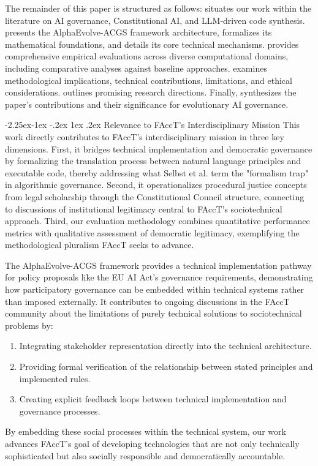 \documentclass[manuscript,screen,review,anonymous,9pt]{acmart}
\makeatletter
\renewcommand\subsection{\@startsection{subsection}{2}{\z@}%
  {-2.25ex\@plus -1ex \@minus -.2ex}%
  {1ex \@plus .2ex}%
  {\normalfont\large\bfseries}}
\makeatother
\begin{document}
The remainder of this paper is structured as follows:  situates our work within the literature on AI governance, Constitutional AI, and LLM-driven code synthesis.  presents the AlphaEvolve-ACGS framework architecture, formalizes its mathematical foundations, and details its core technical mechanisms.  provides comprehensive empirical evaluations across diverse computational domains, including comparative analyses against baseline approaches.  examines methodological implications, technical contributions, limitations, and ethical considerations.  outlines promising research directions. Finally,  synthesizes the paper's contributions and their significance for evolutionary AI governance.

\subsection{Relevance to FAccT's Interdisciplinary Mission}
\label{subsec:facct_relevance}
This work directly contributes to FAccT's interdisciplinary mission in three key dimensions. First, it bridges technical implementation and democratic governance by formalizing the translation process between natural language principles and executable code, thereby addressing what Selbst et al. \cite{Selbst2019FairnessAccountability} term the "formalism trap" in algorithmic governance. Second, it operationalizes procedural justice concepts from legal scholarship through the Constitutional Council structure, connecting to discussions of institutional legitimacy central to FAccT's sociotechnical approach. Third, our evaluation methodology combines quantitative performance metrics with qualitative assessment of democratic legitimacy, exemplifying the methodological pluralism FAccT seeks to advance.

The AlphaEvolve-ACGS framework provides a technical implementation pathway for policy proposals like the EU AI Act's governance requirements, demonstrating how participatory governance can be embedded within technical systems rather than imposed externally. It contributes to ongoing discussions in the FAccT community about the limitations of purely technical solutions to sociotechnical problems by:
\begin{enumerate}[leftmargin=*,itemsep=1pt,parsep=1pt]
    \item Integrating stakeholder representation directly into the technical architecture.
    \item Providing formal verification of the relationship between stated principles and implemented rules.
    \item Creating explicit feedback loops between technical implementation and governance processes.
\end{enumerate}
By embedding these social processes within the technical system, our work advances FAccT's goal of developing technologies that are not only technically sophisticated but also socially responsible and democratically accountable.
\end{document}

